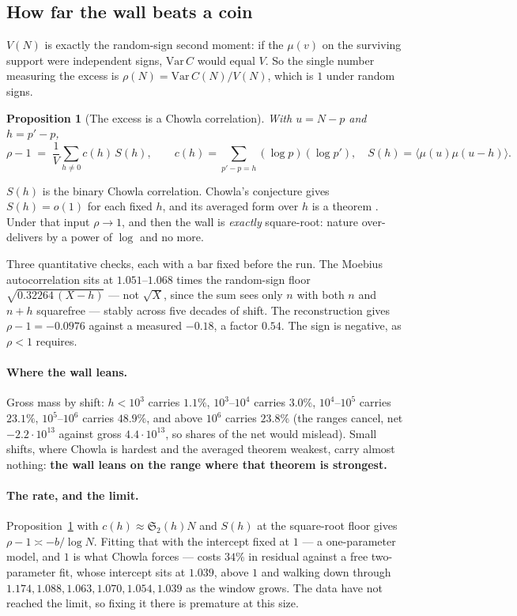 \documentclass[11pt,a4paper]{article}
\theoremstyle{plain}
\newtheorem{proposition}[theorem]{Proposition}
\theoremstyle{definition}
\begin{document}
\subsection{How far the wall beats a coin}

$V(N)$ is exactly the random-sign second moment: if the $\mu(v)$ on the
surviving support were independent signs, $\mathrm{Var}\,C$ would equal
$V$. So the single number measuring the excess is
$\rho(N) = \mathrm{Var}\,C(N)/V(N)$, which is $1$ under random signs.

\begin{proposition}[The excess is a Chowla correlation]\label{prop:W}
With $u=N-p$ and $h=p'-p$,
\[
  \rho-1 \;=\; \frac1V\sum_{h\neq0} c(h)\,S(h),
  \qquad
  c(h)=\sum_{p'-p=h}(\log p)(\log p'),
  \quad
  S(h)=\bigl\langle \mu(u)\mu(u-h)\bigr\rangle .
\]
\end{proposition}

$S(h)$ is the binary Chowla correlation. Chowla's conjecture gives
$S(h)=o(1)$ for each fixed $h$, and its averaged form over $h$ is a
theorem \cite{MRT15}. Under that input $\rho\to1$, and then the wall is
\emph{exactly} square-root: nature over-delivers by a power of $\log$
and no more.

Three quantitative checks, each with a bar fixed before the run. The
Moebius autocorrelation sits at $1.051$--$1.068$ times the random-sign
floor $\sqrt{0.32264\,(X-h)}$ --- not $\sqrt X$, since the sum sees
only $n$ with both $n$ and $n+h$ squarefree --- stably across five
decades of shift. The reconstruction gives $\rho-1=-0.0976$ against a
measured $-0.18$, a factor $0.54$. The sign is negative, as $\rho<1$
requires.

\paragraph{Where the wall leans.} Gross mass by shift:
$h<10^3$ carries $1.1\%$, $10^3$--$10^4$ carries $3.0\%$,
$10^4$--$10^5$ carries $23.1\%$, $10^5$--$10^6$ carries $48.9\%$, and
above $10^6$ carries $23.8\%$ (the ranges cancel, net $-2.2\cdot10^{13}$
against gross $4.4\cdot10^{13}$, so shares of the net would mislead).
Small shifts, where Chowla is hardest and the averaged theorem weakest,
carry almost nothing: \textbf{the wall leans on the range where that
theorem is strongest.}

\paragraph{The rate, and the limit.}
Proposition~\ref{prop:W} with $c(h)\approx\mathfrak S_2(h)N$ and $S(h)$
at the square-root floor gives $\rho-1\asymp-b/\log N$. Fitting that
with the intercept fixed at $1$ --- a one-parameter model, and $1$ is
what Chowla forces --- costs $34\%$ in residual against a free
two-parameter fit, whose intercept sits at $1.039$, above $1$ and
walking down through $1.174, 1.088, 1.063, 1.070, 1.054, 1.039$ as the
window grows. The data have not reached the limit, so fixing it there
is premature at this size.
\end{document}
